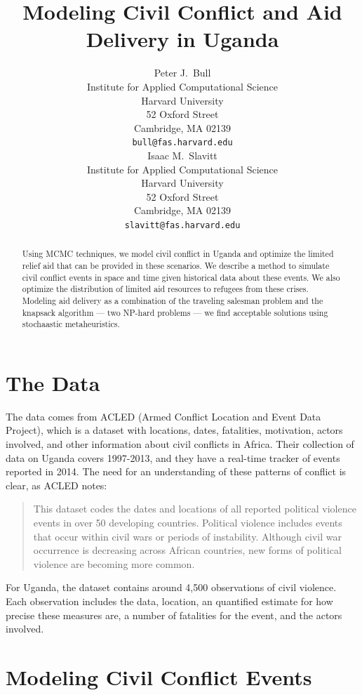 \documentclass{article} %
\title{Modeling Civil Conflict and Aid Delivery in Uganda}
\author{
Peter J.~Bull \\
Institute for Applied Computational Science\\
Harvard University\\
52 Oxford Street \\
Cambridge, MA 02139 \\
\texttt{bull@fas.harvard.edu} \\
\And
Isaac M.~Slavitt \\
Institute for Applied Computational Science\\
Harvard University\\
52 Oxford Street \\
Cambridge, MA 02139 \\
\texttt{slavitt@fas.harvard.edu} \\
}
\begin{document}
\maketitle

\begin{abstract}
Using MCMC techniques, we model civil conflict in Uganda and optimize the limited relief aid that can be provided in these scenarios. We describe a method to simulate civil conflict events in space and time given historical data about these events. We also optimize the distribution of limited aid resources to refugees from these crises. Modeling aid delivery as a combination of the traveling salesman problem and the knapsack algorithm --- two NP-hard problems --- we find acceptable solutions using stochaastic metaheuristics.
\end{abstract}

\section{The Data}

The data comes from ACLED (Armed Conflict Location and Event Data Project), which is a dataset with locations, dates, fatalities, motivation, actors involved, and other information about civil conflicts in Africa. Their collection of data on Uganda covers 1997-2013, and they have a real-time tracker of events reported in 2014.\cite{ACLED} The need for an understanding of these patterns of conflict is clear, as ACLED notes:

\begin{quote}
This dataset codes the dates and locations of all reported political violence events in over 50 developing countries. Political violence includes events that occur within civil wars or periods of instability. Although civil war occurrence is decreasing across African countries, new forms of political violence are becoming more common.
\end{quote}

For Uganda, the dataset contains around 4,500 observations of civil violence. Each observation includes the data, location, an quantified estimate for how precise these measures are, a number of fatalities for the event, and the actors involved.

\section{Modeling Civil Conflict Events}
\end{document}

